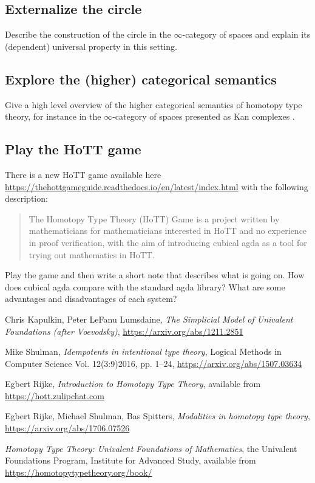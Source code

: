 \documentclass{amsart}
\theoremstyle{definition}
\theoremstyle{remark}
\numberwithin{equation}{section}
\begin{document}
\subsection*{Externalize the circle}

Describe the construction of the circle in the $\infty$-category of spaces and explain its (dependent) universal property in this setting.

\subsection*{Explore the (higher) categorical semantics}

Give a high level overview of the higher categorical semantics of homotopy type theory, for instance in the $\infty$-category of spaces presented as Kan complexes \cite{KLV}.

\subsection*{Play the HoTT game} There is a new HoTT game available here \url{https://thehottgameguide.readthedocs.io/en/latest/index.html} with the following description:
\begin{quote}
The Homotopy Type Theory (HoTT) Game is a project written by mathematicians for mathematicians interested in HoTT and no experience in proof verification, with the aim of introducing cubical agda as a tool for trying out mathematics in HoTT.
\end{quote}
Play the game and then write a short note that describes what is going on. How does cubical agda compare with the standard agda library? What are some advantages and disadvantages of each system?


\begin{thebibliography}{RSS}

 Chris Kapulkin, Peter LeFanu Lumsdaine,  \emph{The Simplicial Model of Univalent Foundations (after Voevodsky)}, \url{https://arxiv.org/abs/1211.2851}

 Mike Shulman, \emph{Idempotents in intentional type theory}, Logical Methods in Computer Science
Vol. 12(3:9)2016, pp. 1--24, \url{https://arxiv.org/abs/1507.03634}

 Egbert Rijke, \emph{Introduction to Homotopy Type Theory}, available from \url{https://hott.zulipchat.com}

 Egbert Rijke, Michael Shulman, Bas Spitters, \emph{Modalities in homotopy type theory}, \url{https://arxiv.org/abs/1706.07526}

 \emph{Homotopy Type Theory: Univalent Foundations of Mathematics}, the Univalent Foundations Program, Institute for Advanced Study, available from \url{https://homotopytypetheory.org/book/}


\end{thebibliography}

 
\end{document}
